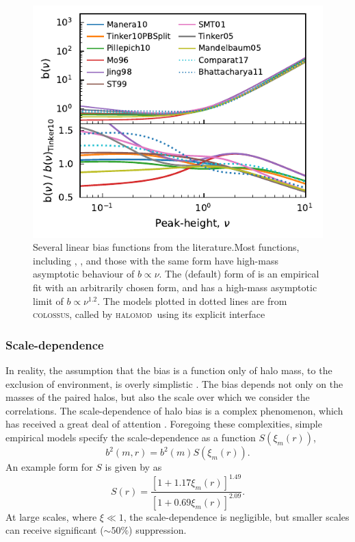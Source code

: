 \documentclass[5p,aas_macros]{elsarticle}
\newcommand{\halomod}{\textsc{halomod}}
\begin{document}
\begin{figure}
  \centering
  \includegraphics[width=\linewidth]{figures/bias_models.pdf}
  \caption[Several bias functions from the literature]{Several linear bias functions from the literature.Most functions, including \protect\citet{Mo1996}, \protect\citet{Sheth1999}, \protect\citet{Sheth2001} and those with the same form \protect\citep{Mandelbaum2005,Tinker2005} have high-mass asymptotic behaviour of $b \propto \nu$. The (default) form of \protect\citet{Tinker2010} is an empirical fit with an arbitrarily chosen form, and has a high-mass asymptotic limit of $b \propto  \nu^{1.2}$. The models plotted in dotted lines are from \textsc{colossus}, called by \halomod\ using its explicit interface}
  \label{fig:bias_functions}
\end{figure}

\subsubsection{Scale-dependence}
\label{sec:theory:bias:sd}
In reality, the assumption that the bias is a function only of halo mass, to the exclusion of environment, is overly simplistic \citep{Sunayama2015}. 
The bias depends not only on the masses of the paired halos, but also the scale over which we consider the correlations. 
The scale-dependence of halo bias is a complex phenomenon, which has received a great deal of attention \citep[eg.][]{Paranjape2013,Lapi2014,Poole2015}. Foregoing these complexities, simple empirical models specify the scale-dependence as a function $S(\xi_m(r))$,
\begin{equation}
    b^2(m,r) = b^2(m) S(\xi_m(r)).
\end{equation}
An example form for $S$ is given by \citet{Tinker2005} as
\begin{equation}
	\label{eq:sdb}
	S(r) = \frac{\left[1+1.17\xi_m(r)\right]^{1.49}}{\left[1+0.69\xi_m(r)\right]^{2.09}}.
\end{equation}
At large scales, where $\xi \ll 1$, the scale-dependence is negligible, but smaller scales can receive significant ($\sim 50\%$) suppression. 
\end{document}
